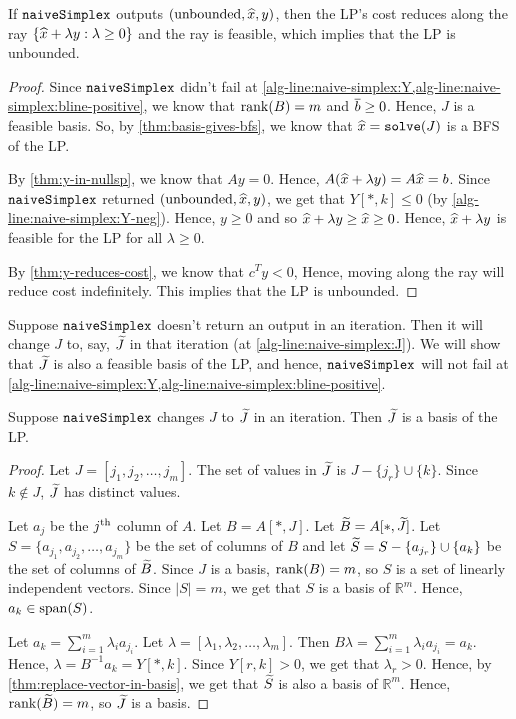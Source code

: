 \begin{theorem}
\label{thm:simplex-unbounded}
If $\operatorname{\mathtt{naiveSimplex}}$ outputs $(\textrm{unbounded}, \widehat{x}, y)$,
then the LP's cost reduces along the ray $\{\widehat{x} + \lambda y: \lambda \ge 0\}$
and the ray is feasible, which implies that the LP is unbounded.
\end{theorem}
\begin{proof}
Since $\operatorname{\mathtt{naiveSimplex}}$ didn't fail at
\cref{alg-line:naive-simplex:Y,alg-line:naive-simplex:bline-positive},
we know that $\operatorname{rank}(B) = m$ and $\overline{b} \ge 0$.
Hence, $J$ is a feasible basis.
So, by \cref{thm:basis-gives-bfs}, we know that $\widehat{x} = \operatorname{\mathtt{solve}}(J)$ is a BFS of the LP.

By \cref{thm:y-in-nullsp}, we know that $Ay = 0$.
Hence, $A(\widehat{x} + \lambda y) = A\widehat{x} = b$.
Since $\operatorname{\mathtt{naiveSimplex}}$ returned $(\textrm{unbounded}, \widehat{x}, y)$,
we get that $Y[*,k] \le 0$ (by \cref{alg-line:naive-simplex:Y-neg}).
Hence, $y \ge 0$ and so $\widehat{x} + \lambda y \ge \widehat{x} \ge 0$.
Hence, $\widehat{x} + \lambda y$ is feasible for the LP for all $\lambda \ge 0$.

By \cref{thm:y-reduces-cost}, we know that $c^Ty < 0$,
Hence, moving along the ray will reduce cost indefinitely.
This implies that the LP is unbounded.
\end{proof}

Suppose $\operatorname{\mathtt{naiveSimplex}}$ doesn't return an output in an iteration.
Then it will change $J$ to, say, $\widetilde{J}$ in that iteration
(at \cref{alg-line:naive-simplex:J}).
We will show that $\widetilde{J}$ is also a feasible basis of the LP,
and hence, $\operatorname{\mathtt{naiveSimplex}}$ will not fail at
\cref{alg-line:naive-simplex:Y,alg-line:naive-simplex:bline-positive}.

\begin{lemma}
\label{thm:simplex-new-basis}
Suppose $\operatorname{\mathtt{naiveSimplex}}$ changes $J$ to $\widetilde{J}$ in an iteration.
Then $\widetilde{J}$ is a basis of the LP.
\end{lemma}
\begin{proof}
Let $J = [j_1, j_2, \ldots, j_m]$.
The set of values in $\widetilde{J}$ is $J - \{j_r\} \cup \{k\}$.
Since $k \not\in J$, $\widetilde{J}$ has distinct values.

Let $a_j$ be the $j^{\textrm{th}}$ column of $A$. Let $B = A[*,J]$. Let $\widetilde{B} = A[*,\widetilde{J}]$.
Let $S = \{a_{j_1}, a_{j_2}, \ldots, a_{j_m}\}$ be the set of columns of $B$
and let $\widetilde{S} = S - \{a_{j_r}\} \cup \{a_k\}$ be the set of columns of $\widetilde{B}$.
Since $J$ is a basis, $\operatorname{rank}(B) = m$, so $S$ is a set of linearly independent vectors.
Since $|S| = m$, we get that $S$ is a basis of $\mathbb{R}^m$. Hence, $a_k \in \operatorname{span}(S)$.

Let $a_k = \sum_{i=1}^m \lambda_i a_{j_i}$. Let $\lambda = [\lambda_1, \lambda_2, \ldots, \lambda_m]$.
Then $B\lambda = \sum_{i=1}^m \lambda_i a_{j_i} = a_k$.
Hence, $\lambda = B^{-1}a_k = Y[*,k]$.
Since $Y[r,k] > 0$, we get that $\lambda_r > 0$.
Hence, by \cref{thm:replace-vector-in-basis}, we get that
$\widetilde{S}$ is also a basis of $\mathbb{R}^m$.
Hence, $\operatorname{rank}(\widetilde{B}) = m$, so $\widetilde{J}$ is a basis.
\end{proof}

